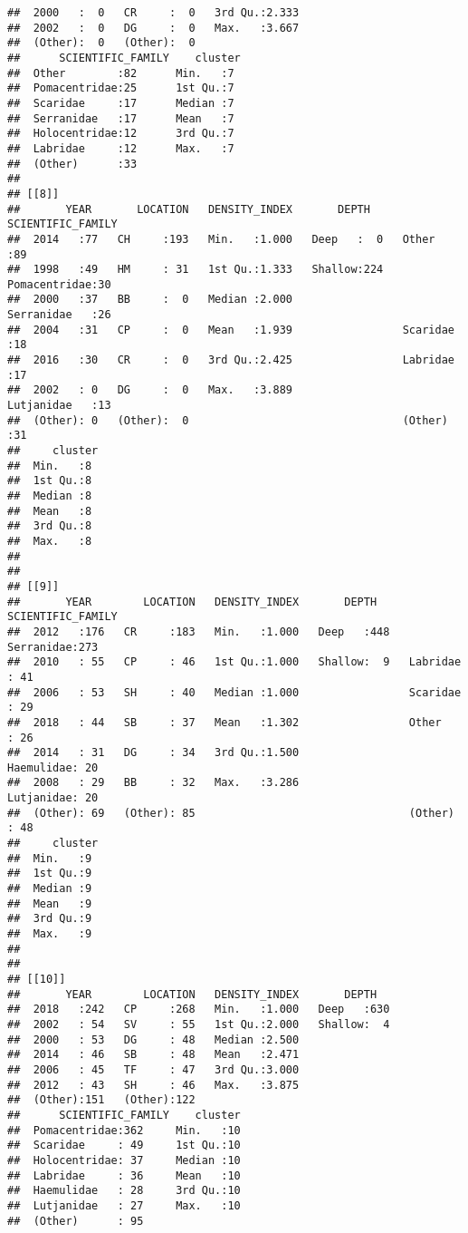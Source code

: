 \documentclass[
]{article}
\begin{document}
\begin{verbatim}
##  2000   :  0   CR     :  0   3rd Qu.:2.333                
##  2002   :  0   DG     :  0   Max.   :3.667                
##  (Other):  0   (Other):  0                                
##      SCIENTIFIC_FAMILY    cluster 
##  Other        :82      Min.   :7  
##  Pomacentridae:25      1st Qu.:7  
##  Scaridae     :17      Median :7  
##  Serranidae   :17      Mean   :7  
##  Holocentridae:12      3rd Qu.:7  
##  Labridae     :12      Max.   :7  
##  (Other)      :33                 
## 
## [[8]]
##       YEAR       LOCATION   DENSITY_INDEX       DEPTH         SCIENTIFIC_FAMILY
##  2014   :77   CH     :193   Min.   :1.000   Deep   :  0   Other        :89     
##  1998   :49   HM     : 31   1st Qu.:1.333   Shallow:224   Pomacentridae:30     
##  2000   :37   BB     :  0   Median :2.000                 Serranidae   :26     
##  2004   :31   CP     :  0   Mean   :1.939                 Scaridae     :18     
##  2016   :30   CR     :  0   3rd Qu.:2.425                 Labridae     :17     
##  2002   : 0   DG     :  0   Max.   :3.889                 Lutjanidae   :13     
##  (Other): 0   (Other):  0                                 (Other)      :31     
##     cluster 
##  Min.   :8  
##  1st Qu.:8  
##  Median :8  
##  Mean   :8  
##  3rd Qu.:8  
##  Max.   :8  
##             
## 
## [[9]]
##       YEAR        LOCATION   DENSITY_INDEX       DEPTH      SCIENTIFIC_FAMILY
##  2012   :176   CR     :183   Min.   :1.000   Deep   :448   Serranidae:273    
##  2010   : 55   CP     : 46   1st Qu.:1.000   Shallow:  9   Labridae  : 41    
##  2006   : 53   SH     : 40   Median :1.000                 Scaridae  : 29    
##  2018   : 44   SB     : 37   Mean   :1.302                 Other     : 26    
##  2014   : 31   DG     : 34   3rd Qu.:1.500                 Haemulidae: 20    
##  2008   : 29   BB     : 32   Max.   :3.286                 Lutjanidae: 20    
##  (Other): 69   (Other): 85                                 (Other)   : 48    
##     cluster 
##  Min.   :9  
##  1st Qu.:9  
##  Median :9  
##  Mean   :9  
##  3rd Qu.:9  
##  Max.   :9  
##             
## 
## [[10]]
##       YEAR        LOCATION   DENSITY_INDEX       DEPTH    
##  2018   :242   CP     :268   Min.   :1.000   Deep   :630  
##  2002   : 54   SV     : 55   1st Qu.:2.000   Shallow:  4  
##  2000   : 53   DG     : 48   Median :2.500                
##  2014   : 46   SB     : 48   Mean   :2.471                
##  2006   : 45   TF     : 47   3rd Qu.:3.000                
##  2012   : 43   SH     : 46   Max.   :3.875                
##  (Other):151   (Other):122                                
##      SCIENTIFIC_FAMILY    cluster  
##  Pomacentridae:362     Min.   :10  
##  Scaridae     : 49     1st Qu.:10  
##  Holocentridae: 37     Median :10  
##  Labridae     : 36     Mean   :10  
##  Haemulidae   : 28     3rd Qu.:10  
##  Lutjanidae   : 27     Max.   :10  
##  (Other)      : 95
\end{verbatim}
\end{document}
